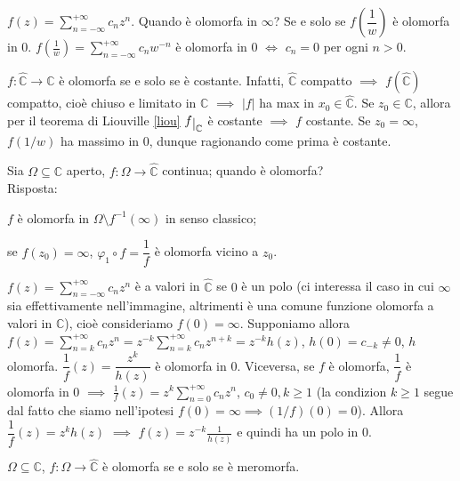 \begin{ex}
  $\displaystyle f(z)=\sum_{n=-\infty}^{+\infty} c_nz^n$. Quando è olomorfa in $\infty$? Se e solo se $f\left(\dfrac{1}{w}\right)$ è olomorfa in $0$.
  $\displaystyle f\left(\frac{1}{w}\right)=\sum_{n=-\infty}^{+\infty} c_nw^{-n}$ è olomorfa in $0$ $\iff$ $c_n=0$ per ogni $n>0$.
\end{ex}

\begin{oss}
  $f: \hat{\mathbb{C}} \rightarrow \mathbb{C}$ è olomorfa se e solo se è costante. Infatti, $\hat{\mathbb{C}}$ compatto $\implies$ $f(\hat{\mathbb{C}})$ compatto, cioè chiuso e limitato in $\mathbb{C}$ $\implies$ $|f|$ ha max in $x_0 \in \hat{\mathbb{C}}$.
  Se $z_0 \in \mathbb{C}$, allora per il teorema di Liouville \ref{liou} $f \restrict{\mathbb{C}}$ è costante $\implies$ $f$ costante. Se $z_0=\infty$, $f(1/w)$ ha massimo in $0$, dunque ragionando come prima è costante.
\end{oss}

Sia $\Omega \subseteq \mathbb{C}$ aperto, $f:\Omega \rightarrow \hat{\mathbb{C}}$ continua; quando è olomorfa? \\
Risposta:
\begin{nlist}
  \item $f$ è olomorfa in $\Omega \setminus f^{-1}(\infty)$ in senso classico;
  \item se $f(z_0)=\infty$, $\varphi_1 \circ f=\dfrac{1}{f}$ è olomorfa vicino a $z_0$.
\end{nlist}

\begin{ex}
  $\displaystyle f(z)=\sum_{n=-\infty}^{+\infty} c_nz^n$ è a valori in $\hat{\mathbb{C}}$ se $0$ è un polo (ci interessa il caso in cui $\infty$ sia effettivamente nell'immagine, altrimenti è una comune funzione olomorfa a valori in $\mathbb{C}$), cioè consideriamo $f(0)=\infty$.
  Supponiamo allora $\displaystyle f(z)=\sum_{n=k}^{+\infty} c_nz^n=z^{-k}\sum_{n=k}^{+\infty} c_nz^{n+k}=z^{-k}h(z)$, $h(0)=c_{-k}\not=0$, $h$ olomorfa. $\dfrac{1}{f}(z)=\dfrac{z^k}{h(z)}$ è olomorfa in $0$.
  Viceversa, se $f$ è olomorfa, $\dfrac{1}{f}$ è olomorfa in $0$ $\implies$ $\displaystyle \frac{1}{f}(z)=z^k\sum_{n=0}^{+\infty}c_nz^n$, $c_0 \not=0, k \ge 1$ (la condizion $k \ge 1$ segue dal fatto che siamo nell'ipotesi $f(0)=\infty \implies (1/f)(0)=0$).
  Allora $\dfrac{1}{f}(z)=z^kh(z)$ $\implies$ $f(z)=z^{-k}\frac{1}{h(z)}$ e quindi ha un polo in $0$.
\end{ex}

\begin{cor}
  $\Omega \subseteq \mathbb{C}$, $f:\Omega \rightarrow \hat{\mathbb{C}}$ è olomorfa se e solo se è meromorfa.
\end{cor}

